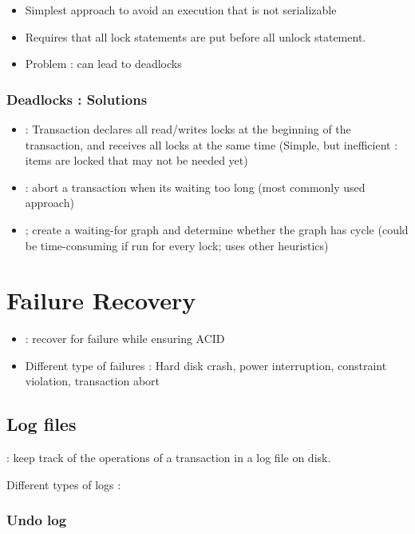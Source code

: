 \begin{itemize}
    \item Simplest approach to avoid an execution that is not serializable
    \item Requires that all lock statements are put before all unlock statement.
    \item Problem : can lead to deadlocks
\end{itemize}

\subsubsection{Deadlocks : Solutions}

\begin{itemize}
    \item {} : Transaction declares all read/writes locks at the beginning of the transaction, and receives all locks at the same time (Simple, but inefficient : items are locked that may not be needed yet)
    \item {} : abort a transaction when its waiting too long (most commonly used approach)
    \item {} ; create a waiting-for graph and determine whether the graph has cycle (could be time-consuming if run for every lock; uses other heuristics)
\end{itemize}

\section{Failure Recovery}

\begin{itemize}
    \item {} : recover for failure while ensuring ACID
    \item Different type of failures : Hard disk crash, power interruption, constraint violation, transaction abort
\end{itemize}

\subsection{Log files}

 : keep track of the operations of a transaction in a log file on disk.

Different types of logs :

\subsubsection{Undo log}


